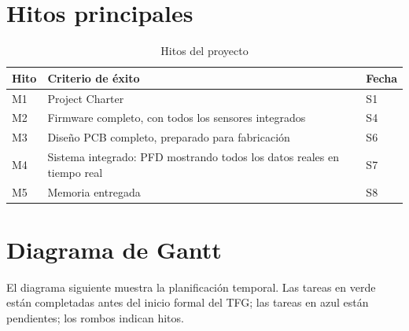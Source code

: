 \section{Hitos principales}

\begin{table}[H]
\centering
\caption{Hitos del proyecto}
\label{tab:hitos}
\small
\begin{tabularx}{\textwidth}{l X l}
\toprule
\textbf{Hito} & \textbf{Criterio de éxito} & \textbf{Fecha} \\
\midrule
M1 & Project Charter & S1 \\
M2 & Firmware completo, con todos los sensores integrados & S4 \\
M3 & Diseño PCB completo, preparado para fabricación & S6 \\
M4 & Sistema integrado: PFD mostrando todos los datos reales en tiempo real & S7 \\
M5 & Memoria entregada & S8 \\
\bottomrule
\end{tabularx}
\end{table}

\newpage
\section{Diagrama de Gantt}

El diagrama siguiente muestra la planificación temporal. Las tareas en verde están completadas antes del inicio formal del TFG; las tareas en azul están pendientes; los rombos indican hitos.

\vspace{1em}

